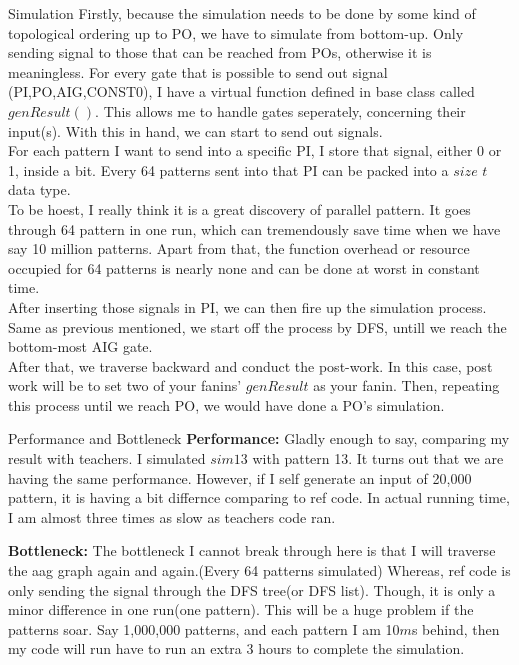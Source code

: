 \documentclass[12pt,a4paper]{report}
\begin{document}
\begin{section}{Simulation}
  Firstly, because the simulation needs to be done by some kind of topological ordering up to PO,
  we have to simulate from bottom-up. 
  Only sending signal to those that can be reached from POs, otherwise it is meaningless. For every gate that
  is possible to send out signal (PI,PO,AIG,CONST0), I have a virtual function defined in base class called $genResult()$. This allows me to
  handle gates seperately, concerning their input(s). With this in hand, we can start to send out signals.\\
  For each pattern I want to send into a specific PI, I store that signal, either 0 or 1, inside a bit.
  Every 64 patterns sent into that PI can be packed into a $size$ $t$ data type.\\
  To be hoest, I really think it is a great discovery of parallel pattern. It goes through 64 pattern in one run, which
  can tremendously save time when we have say 10 million patterns. Apart from that, the function overhead or
  resource occupied for 64 patterns is nearly none and can be done at worst in constant time.\\
  After inserting those signals in PI, we can then fire up the simulation process. Same as previous
  mentioned, we start off the process by DFS, untill we reach the bottom-most AIG gate.\\
  After that, we traverse backward and conduct the post-work. In this case, post work will be
  to set two of your fanins' $genResult$ as your fanin. Then, repeating this process until we reach PO,
  we would have done a PO's simulation.
\begin{subsection}{Performance and Bottleneck}
  \textbf{Performance:} Gladly enough to say, comparing my result with teachers. I simulated $sim13$ with pattern 13. It turns out that we are
  having the same performance. However, if I self generate an input of 20,000 pattern, it is having a bit differnce comparing
  to ref code. In actual running time, I am almost three times as slow as teachers code ran.
  
  \textbf{Bottleneck:} The bottleneck I cannot break through here is that I will traverse the aag graph again and again.(Every 
  64 patterns simulated) Whereas,
  ref code is only sending the signal through the DFS tree(or DFS list). Though, it is only a minor difference in one run(one pattern).
  This will be a huge problem if the patterns soar. Say 1,000,000 patterns, and each pattern I am 10$m$s behind, then my code
  will run have to run an extra 3 hours to complete the simulation.
\end{subsection}
\end{section}
\end{document}
